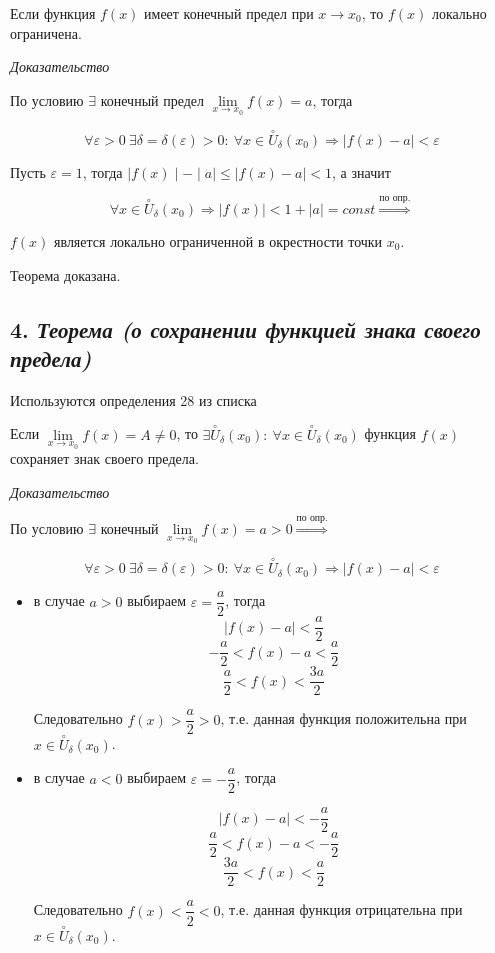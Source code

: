 Если функция $f(x)$ имеет конечный предел при $x \rightarrow x_0$, то $f(x)$ локально ограничена.
\vspace*{20pt} 

\textit{Доказательство}

По условию $\exists$ конечный предел $\lim\limits_{x \to x_0}f(x) = a$, тогда

$$
\forall {\varepsilon} > 0 \ \exists\delta=\delta({\varepsilon} )>0: \ \forall x \in \overset{\circ}U_\delta(x_0) \Rightarrow | f(x) - a|  < {\varepsilon}
$$

Пусть ${\varepsilon} = 1$, тогда $\mid  f(x)\mid   - \mid  a\mid   \leqslant \mid  f(x) - a\mid   < 1$, а значит

$$
\forall x \in \overset{\circ}U_\delta(x_0) \Rightarrow | f(x)|  <1 + |a|  = const \overset{\text{по опр.}}{\Rightarrow}$$

$f(x)$ является локально ограниченной в окрестности точки $x_0$.

Теорема доказана.
\newpage 
\subsection*{4. \textit{Теорема (о сохранении функцией знака своего предела)}}
\begin{Quote2} 
\small\centering 

Используются определения 28 из списка \end{Quote2} 

Если $\lim\limits_{x \to x_0} f(x) = A \neq 0$, то $\exists \overset{\circ}U_\delta(x_0): \ \forall x \in \overset{\circ}U_\delta(x_0)$ функция $f(x)$ сохраняет знак своего предела.
\vspace*{20pt} 

\textit{Доказательство}

По условию $\exists$ конечный $\lim\limits_{x \to x_0} f(x) = a > 0 \overset{\text{по опр.}}{\Rightarrow}$

$$
\forall {\varepsilon} > 0 \ \exists\delta=\delta({\varepsilon} )>0: \ \forall x \in \overset{\circ}U_\delta(x_0) \Rightarrow | f(x) - a|  < {\varepsilon}
$$
\begin{itemize}

\item в случае $a > 0$ выбираем ${\varepsilon} = {\dfrac{a}{2}}$, тогда $$| f(x) - a|  < {\dfrac{a}{2}}$$ $$-{\dfrac{a}{2}}< f(x) - a < {\dfrac{a}{2}}$$ $${\dfrac{a}{2}}< f(x) < {\dfrac{3a}{2}}$$

Следовательно $f(x) > {\dfrac{a}{2}}>0$, т.е. данная функция положительна при $x \in \overset{\circ}U_\delta(x_0)$.
\item в случае $a < 0$ выбираем ${\varepsilon} = -{\dfrac{a}{2}}$, тогда

$$| f(x) - a|  < - {\dfrac{a}{2}}$$ $${\dfrac{a}{2}}< f(x) - a < -{\dfrac{a}{2}}$$ $${\dfrac{3a}{2}}< f(x) < {\dfrac{a}{2}}$$

Следовательно $f(x) < {\dfrac{a}{2}}< 0$, т.е. данная функция отрицательна при $x \in \overset{\circ}U_\delta(x_0)$.

\end{itemize}

